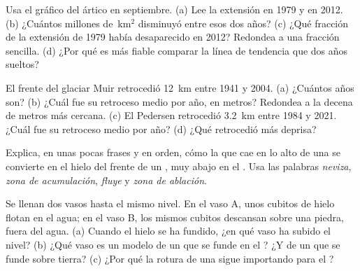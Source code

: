 \begin{exercise}[$\star\star$]\label{exo:g8:ice-on-earth:5}
Usa el gráfico del  ártico en septiembre. (a) Lee la extensión
en 1979 y en 2012. (b) ¿Cuántos millones de~km$^2$ disminuyó entre esos dos
años? (c) ¿Qué fracción de la extensión de 1979 había desaparecido en 2012?
Redondea a una fracción sencilla. (d) ¿Por qué es más fiable comparar la
línea de tendencia que dos años sueltos?
\end{exercise}

\begin{exercise}[$\star\star$]\label{exo:g8:ice-on-earth:6}
El frente del glaciar Muir retrocedió \qty{12}{km} entre 1941 y 2004.
(a) ¿Cuántos años son? (b) ¿Cuál fue su retroceso medio por año, en metros?
Redondea a la decena de metros más cercana. (c) El  Pedersen
retrocedió \qty{3.2}{km} entre 1984 y 2021. ¿Cuál fue su retroceso medio
por año? (d) ¿Qué  retrocedió más deprisa?
\end{exercise}

\begin{exercise}[$\star\star$]\label{exo:g8:ice-on-earth:7}
Explica, en unas pocas frases y en orden, cómo la  que cae en lo alto
de una  se convierte en el hielo del frente de un , muy
abajo en el . Usa las palabras \emph{neviza}, \emph{zona de
acumulación}, \emph{fluye} y \emph{zona de ablación}.
\end{exercise}

\begin{exercise}[$\star\star$]\label{exo:g8:ice-on-earth:8}
Se llenan dos vasos hasta el mismo nivel. En el vaso A, unos cubitos de
hielo flotan en el agua; en el vaso B, los mismos cubitos descansan sobre
una piedra, fuera del agua. (a) Cuando el hielo se ha fundido, ¿en qué vaso
ha subido el nivel? (b) ¿Qué vaso es un modelo de un  que se funde
en el ? ¿Y de un  que se funde sobre tierra? (c) ¿Por qué
la rotura de una  sigue importando para el ?
\end{exercise}

